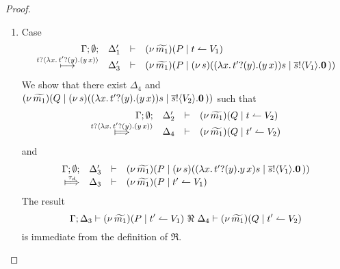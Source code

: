 \begin{proof}
\begin{enumerate}[1.]
\begin{enumerate}
\begin{eqnarray*}
								\horel{\Gamma}{\Delta_1''}{\newsp{\widetilde{m_1}}{P' \Par \newsp{s}{\bout{t'}{s} \inact} }}
								{\fwb}
								{\Delta_2''}{\newsp{\widetilde{m_2}}{Q'}  \Par \newsp{s}{\bout{t'}{s} \inact}}
								\label{proof:trig_equiv3}
							\end{eqnarray*}
							The freshness of $t$ allows us to mimic the transitions
							in \eqref{proof:trig_equiv2} to infer that for $\Delta_4$
							\begin{eqnarray*}
								\begin{array}{crll}
									& \Gamma; \es; \Delta_2' & \proves &		
									\newsp{\widetilde{m_2}}{Q \Par \ntrigger{t}{V_2}}
									\\
									\Hby{} &&&
									\newsp{\widetilde{m_2}}{Q_2 \Par \ntrigger{t}{V_2}}
									\\
									{\hby{\bactinp{t}{\omapchar{\btinp{U} \tinact}}}}& & &
									\newsp{\widetilde{m_2}}{Q_2 \Par \newsp{s}{\appl{\omapchar{\btinp{U} \tinact}}{s} \Par \bout{\dual{s}}{V_2} \inact}}
									\\
									\Hby{} & \Delta_4 & \proves & \newsp{\widetilde{m_2}'}{Q' \Par \newsp{s}{\bout{t'}{s} \inact} }
								\end{array}
							\end{eqnarray*}
							and 
							\[
								\horel{\Gamma}{\Delta_3}{\newsp{\widetilde{m_1}}{P \Par \newsp{s}{ \appl{\omapchar{\btinp{U} \tinact}}{s} \Par \bout{\dual{s}}{V_1} \inact}}}
								{\Hby{\dtau}}
								{\Delta_3}{\newsp{\widetilde{m_1}'}{P' \Par \newsp{s}{ \bout{t'}{s} \inact}}}
							\]
							The conclusion is immediate from \eqref{proof:trig_equiv3}.

					\item	Case
						\[
							\begin{array}{rcll} \Gamma; \emptyset; &\Delta_1'& \vdash& (\nu\, \widetilde{m_1})(P \;|\; t \leftharpoonup V_1)\\ \stackrel{t ? \langle  \lambda x.\,t' ? (y) .{(y\, {x})}  \rangle}{\longmapsto} &\Delta_3'& \vdash &  (\nu\, \widetilde{m_1})(P \;|\; (\nu\, s)(  (\lambda x.\,t' ? (y) .{(y\, {x})}){s}  \;|\; \overline{s} ! \langle V_1 \rangle . \mathbf{0} \, {)}) \end{array}
						\]
						We show that there
                                                exist $\Delta_4$ and  $(\nu\, \widetilde{m_1})(Q \;|\; (\nu\, s)(  (\lambda x.\,t' ? (y) .{(y\, {x})}){s}  \;|\; \overline{s} ! \langle V_2 \rangle . \mathbf{0} \, {)})$ such that
						\[
							\mhorel{\Gamma}{\Delta_2'}{\newsp{\widetilde{m_1}}{Q \Par \ntrigger{t}{V_2}}}
							{\Hby{\bactinp{t}{ \abs{x}{\binp{t'}{y}{(\appl{y}{x})}  }}}}
							{\Delta_4}{}{\newsp{\widetilde{m_1}}{Q \Par \ntrigger{t'}{V_2} }}
						\]
						and
						\[
							\mhorel{\Gamma}{\Delta_3'}{\newsp{\widetilde{m_1}}{P \Par \newsp{s}{ \appl{(\abs{x}{\binp{t'}{y}{\appl{y}{x}})}{s}  \Par \bout{\dual{s}}{V_1} \inact }}}}
							{\Hby{\tau_d}}
							{\Delta_3}{}{\newsp{\widetilde{m_1}}{P \Par \ntrigger{t'}{V_1}}}
						\]
						The result
						\[
							\Gamma; \Delta_3 \vdash (\nu\, \widetilde{m_1})(P \;|\; t' \leftharpoonup V_1) \ \Re\  \Delta_4 \vdash (\nu\, \widetilde{m_1})(Q \;|\; t' \leftharpoonup V_2)
						\]
						is immediate from the definition of $\Re$.


\end{enumerate}
\end{enumerate}
\end{proof}
